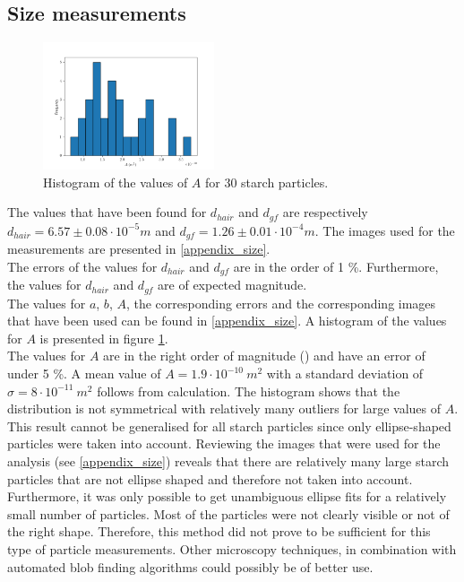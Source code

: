 \subsection{Size measurements}
\begin{figure}
    \centering
    \vspace{-1cm}
    \includegraphics[width=0.45\textwidth,keepaspectratio]{afbeeldingen/histogram_zetmeel.png}
    \caption{Histogram of the values of $A$ for 30 starch particles.}
    \label{fig_histogram_zetmeel}
\end{figure}

The values that have been found for $d_{hair}$ and $d_{gf}$ are respectively $d_{hair} = 6.57 \pm 0.08 \cdot 10^{-5} m $ and $d_{gf} =  1.26 \pm 0.01 \cdot 10^{-4} m $. The images used for the measurements are presented in \ref{appendix_size}.\\
The errors of the values for $d_{hair}$ and $d_{gf}$ are in the order of 1 \%. Furthermore, the values for $d_{hair}$ and $d_{gf}$ are of expected magnitude.\\
The values for $a$, $b$, $A$, the corresponding errors and the corresponding images that have been used can be found in \ref{appendix_size}. A histogram of the values for $A$ is presented in figure \ref{fig_histogram_zetmeel}.\\
The values for $A$ are in the right order of magnitude (\cite{starch}) and have an error of under 5 \%. A mean  value of $A=1.9\cdot10^{-10} \: m^2$ with a standard deviation of $\sigma = 8 \cdot10^{-11} \: m^2$ follows from calculation. The histogram shows that the distribution is not symmetrical with relatively many outliers for large values of $A$. This result cannot be generalised for all starch particles since only ellipse-shaped particles were taken into account. Reviewing the images that were used for the analysis (see \ref{appendix_size}) reveals that there are relatively many large starch particles that are not ellipse shaped and therefore not taken into account. Furthermore, it was only possible to get unambiguous ellipse fits for a relatively small number of particles. Most of the particles were not clearly visible or not of the right shape. Therefore, this method did not prove to be sufficient for this type of particle measurements. Other microscopy techniques, in combination with automated blob finding algorithms could possibly be of better use.\\

